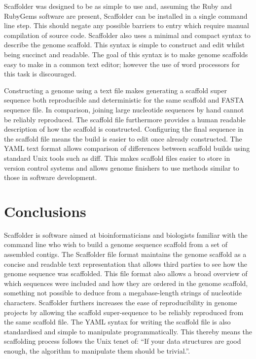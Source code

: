 \documentclass[10pt]{bmc_article}
\newenvironment{bmcformat}{\begin{raggedright}\baselineskip20pt\sloppy\setboolean{publ}{false}}{\end{raggedright}\baselineskip20pt\sloppy}
\begin{document}
\begin{bmcformat}
Scaffolder was designed to be as simple to use and, assuming the Ruby and
RubyGems software are present, Scaffolder can be installed in a single command
line step. This should negate any possible barriers to entry which require
manual compilation of source code. Scaffolder also uses a minimal and compact
syntax to describe the genome scaffold. This syntax is simple to construct and
edit whilst being succinct and readable. The goal of this syntax is to make
genome scaffolds easy to make in a common text editor; however the use of word
processors for this task is discouraged. \pb

Constructing a genome using a text file makes generating a scaffold super
sequence both reproducible and deterministic for the same scaffold and FASTA
sequence file. In comparison, joining large nucleotide sequences by hand cannot
be reliably reproduced. The scaffold file furthermore provides a human readable
description of how the scaffold is constructed. Configuring the final sequence
in the scaffold file means the build is easier to edit once already
constructed. The YAML text format allows comparison of differences between
scaffold builds using standard Unix tools such as diff. This makes scaffold
files easier to store in version control systems and allows genome finishers to
use methods similar to those in software development. \pb 

\clearpage

\section*{Conclusions} %

Scaffolder is software aimed at bioinformaticians and biologists familiar with
the command line who wish to build a genome sequence scaffold from a set of
assembled contigs. The Scaffolder file format maintains the genome scaffold as
a concise and readable text representation that allows third parties to see how
the genome sequence was scaffolded. This file format also allows a broad
overview of which sequences were included and how they are ordered in the
genome scaffold, something not possible to deduce from a megabase-length
strings of nucleotide characters. Scaffolder furthers increases the ease of
reproducibility in genome projects by allowing the scaffold super-sequence to
be reliably reproduced from the same scaffold file. The YAML syntax for writing
the scaffold file is also standardised and simple to manipulate
programmatically. This thereby means the scaffolding process follows the Unix
tenet of: ``If your data structures are good enough, the algorithm to
manipulate them should be trivial.''.


\end{bmcformat}
\end{document}
